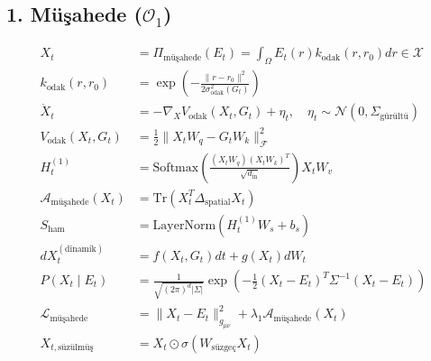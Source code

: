 \documentclass[11pt, a4paper]{article}
\begin{document}
\subsection{1. Müşahede ($\mathcal{O}_1$)}
\begin{align}
X_t &= \Pi_{\text{müşahede}}(E_t) = \int_{\Omega} E_t(r) k_{\text{odak}}(r, r_0) dr \in \mathcal{X} \\
k_{\text{odak}}(r, r_0) &= \exp\left( -\frac{\|r - r_0\|^2}{2 \sigma_{\text{odak}}^2(G_t)} \right) \\
\dot{X}_t &= -\nabla_{X} V_{\text{odak}}(X_t, G_t) + \eta_t, \quad \eta_t \sim \mathcal{N}(0, \Sigma_{\text{gürültü}}) \\
V_{\text{odak}}(X_t, G_t) &= \frac{1}{2} \|X_t W_q - G_t W_k\|_{\mathcal{F}}^2 \\
H_t^{(1)} &= \text{Softmax}\left(\frac{(X_t W_q)(X_t W_k)^T}{\sqrt{d_{\text{in}}}}\right) X_t W_v \\
\mathcal{A}_{\text{müşahede}}(X_t) &= \text{Tr}(X_t^T \Delta_{\text{spatial}} X_t) \\
S_{\text{ham}} &= \text{LayerNorm}(H_t^{(1)} W_s + b_s) \\
d X_t^{(\text{dinamik})} &= f(X_t, G_t)dt + g(X_t)dW_t \\
P(X_t \mid E_t) &= \frac{1}{\sqrt{(2\pi)^d |\Sigma|}} \exp\left( -\frac{1}{2}(X_t - E_t)^T \Sigma^{-1} (X_t - E_t) \right) \\
\mathcal{L}_{\text{müşahede}} &= \| X_t - E_t \|_{g_{\mu\nu}}^2 + \lambda_1 \mathcal{A}_{\text{müşahede}}(X_t) \\
X_{t, \text{süzülmüş}} &= X_t \odot \sigma(W_{\text{süzgeç}} X_t)
\end{align}
\end{document}
